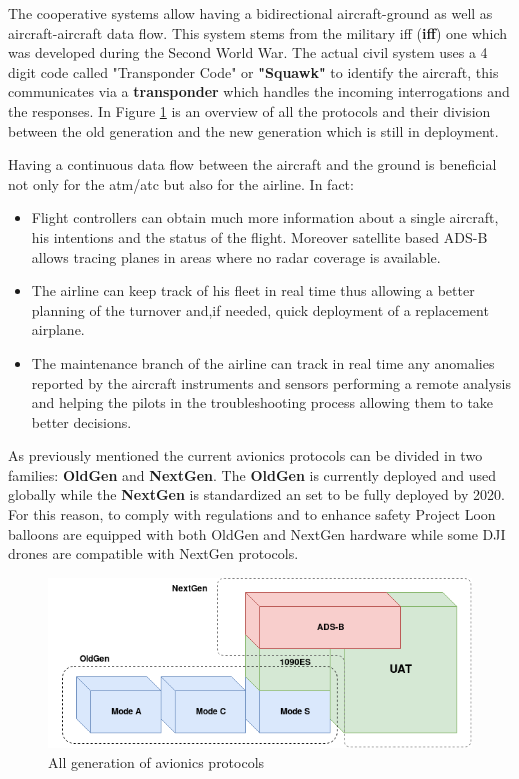 \documentclass[../main.tex]{subfiles}
\begin{document}
The cooperative systems allow having a bidirectional aircraft-ground as well as aircraft-aircraft data flow. This system stems from the military \acrlong{iff} (\textbf{\acrshort{iff}}) one which was developed during the Second World War. The actual civil system uses a 4 digit code called "Transponder Code" or \textbf{"Squawk"} to identify the aircraft, this communicates via a \textbf{transponder} which handles the incoming interrogations and the responses. In Figure \ref{fig:allgen} is an overview of all the protocols and their division between the old generation and the new generation which is still in deployment.

Having a continuous data flow between the aircraft and the ground is beneficial not only for the \acrshort{atm}/\acrshort{atc} but also for the airline. In fact:
\begin{itemize}
  \item Flight controllers can obtain much more information about a single aircraft, his intentions and the status of the flight. Moreover satellite based ADS-B allows tracing planes in areas where no radar coverage is available.
  \item The airline can keep track of his fleet in real time thus allowing a better planning of the turnover and,if needed, quick deployment of a replacement airplane.
  \item The maintenance branch of the airline can track in real time any anomalies reported by the aircraft instruments and sensors performing a remote analysis and helping the pilots in the troubleshooting process allowing them to take better decisions.
\end{itemize}

As previously mentioned the current avionics protocols can be divided in two families: \textbf{OldGen} and \textbf{NextGen}. The \textbf{OldGen} is currently deployed and used globally while the \textbf{NextGen} is standardized an set to be fully deployed by 2020. For this reason, to comply with regulations and to enhance safety Project Loon balloons are equipped with both OldGen and NextGen hardware\cite{loonadsb} while some DJI drones are compatible with NextGen protocols\cite{dji}.

\begin{figure}[htp]
  \centering
  \includegraphics[scale=0.6]{images/allgen.png}
  \caption{All generation of avionics protocols}
  \label{fig:allgen}
\end{figure}
\end{document}
